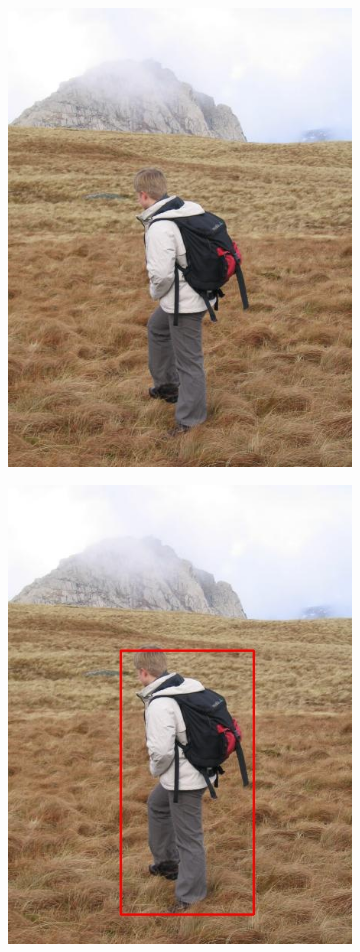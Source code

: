 \documentclass[a4paper,11]{article}
\begin{document}
\begin{center}
\begin{figure}[H]
   \begin{subfigure}{0.33\textwidth}
      \centering
      \includegraphics[width=0.9\linewidth]{images/person3}
    \end{subfigure}
    \begin{subfigure}{.33\textwidth}
      \centering
      \includegraphics[width=0.9\linewidth]{results/input/person3}

\end{subfigure}
\end{figure}
\end{center}
\end{document}
